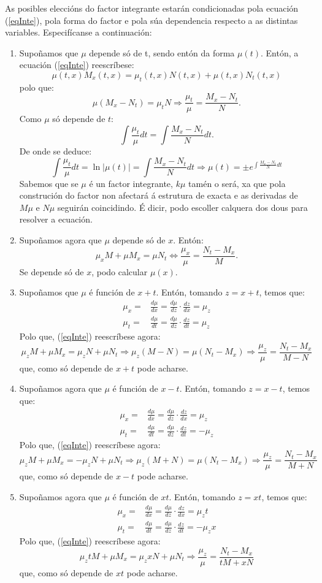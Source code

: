 \documentclass[11pt, a4paper,twoside]{article}
\theoremstyle{theorem-style}  %
\theoremstyle{definition-style}
\theoremstyle{example-style}
\providecommand{\abs}[1]{\left\lvert#1\right\rvert} %
\begin{document}
As posibles eleccións do factor integrante estarán condicionadas pola ecuación (\ref{eqInte}), pola forma do factor e pola súa dependencia respecto a as distintas variables. Especifícanse a continuación:
\begin{enumerate}
	\item Supoñamos que $\mu$ depende só de t, sendo entón da forma $\mu(t)$. Entón, a ecuación (\ref{eqInte}) reescríbese:
	\[\mu(t, x)M_x(t, x) = \mu_t(t, x)N(t, x) + \mu(t, x)N_t(t, x)\]
	polo que:
	\[\mu\left( M_x-N_t\right) = \mu_t N \Rightarrow \frac{\mu_t}{\mu} = \frac{M_x - N_t}{N}.\]
	Como $ \mu $ só depende de $t$:
	\[\int \frac{\mu_t}{\mu}dt = \int \frac{M_x - N_t}{N}dt.\]
	De onde se deduce:
	\[ \int \frac{\mu_t}{\mu}dt = \ln\abs{\mu(t)}= \int \frac{M_x - N_t}{N}dt\Rightarrow \mu(t)=\pm e^{\int \frac{M_x - N_t}{N}dt}\]
	Sabemos que se $ \mu $ é un factor integrante, $ k\mu $ tamén o será, xa que pola construción do factor non afectará á estrutura de exacta e as derivadas de $ M\mu $ e $ N\mu $ seguirán coincidindo. É dicir, podo escoller calquera dos dous para resolver a ecuación.
	\item Supoñamos agora que $\mu$ depende só de $x$. Entón:
	\[\mu_xM + \mu M_x = \mu N_t \Leftrightarrow \frac{\mu_x}{\mu} = \frac{N_t - M_x}{M}.\]
	Se depende só de $x$, podo calcular $\mu (x)$.
	\item  Supoñamos que $\mu$ é función de $x+t$. Entón, tomando $z=x+t$, temos que:
	\begin{align*}
		\mu_x = & \frac{d\mu}{dx} = \frac{d\mu}{dz} \cdot \frac{dz}{dx} = \mu_z \\
		\mu_t = & \frac{d\mu}{dt} = \frac{d\mu}{dz} \cdot \frac{dz}{dt} = \mu_z 
	\end{align*}
	Polo que, (\ref{eqInte}) reescríbese agora:
	\[\mu_z M + \mu M_x = \mu_z N + \mu N_t \Rightarrow \mu_z (M-N) = \mu (N_t - M_x) \Rightarrow \frac{\mu_z}{\mu} = \frac{N_t - M_x}{M - N}\]
	que, como só depende de $x+t$ pode acharse.
	\item Supoñamos agora que $\mu$ é función de $x-t$. Entón, tomando $z=x-t$, temos que:
	\begin{align*}
	\mu_x = & \frac{d\mu}{dx} = \frac{d\mu}{dz} \cdot \frac{dz}{dx} = \mu_z \\
	\mu_t = & \frac{d\mu}{dt} = \frac{d\mu}{dz} \cdot \frac{dz}{dt} = -\mu_z 
	\end{align*}
	Polo que, (\ref{eqInte}) reescríbese agora:
	\[\mu_z M + \mu M_x = -\mu_z N + \mu N_t \Rightarrow \mu_z (M+N) = \mu (N_t - M_x) \Rightarrow \frac{\mu_z}{\mu} = \frac{N_t - M_x}{M + N}\]
	que, como só depende de $x-t$ pode acharse.
	\item Supoñamos agora que $\mu$ é función de $xt$. Entón, tomando $z=xt$, temos que:
	\begin{align*}
	\mu_x = & \frac{d\mu}{dx} = \frac{d\mu}{dz} \cdot \frac{dz}{dx} = \mu_zt \\
	\mu_t = & \frac{d\mu}{dt} = \frac{d\mu}{dz} \cdot \frac{dz}{dt} = -\mu_zx 
	\end{align*}
	Polo que, (\ref{eqInte}) reescríbese agora:
	\[\mu_z tM + \mu M_x = \mu_z xN + \mu N_t \Rightarrow \frac{\mu_z}{\mu} = \frac{N_t - M_x}{tM + xN}\]
	que, como só depende de $xt$ pode acharse.
\end{enumerate}
\end{document}
